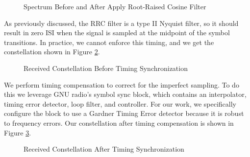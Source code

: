 \documentclass[conference,onecolumn]{IEEEtran}
\begin{document}
\begin{figure}[H]
	\centerline{}
	\caption{Spectrum Before and After Apply Root-Raised Cosine Filter}
	\label{fig::root_raised_cosine_spectrum}
\end{figure}

\noindent As previously discussed, the RRC filter is a type II Nyquist filter, so it should result in zero ISI when the signal is sampled at the midpoint of the symbol transitions. In practice, we cannot enforce this timing, and we get the constellation shown in Figure \ref{fig::constellation_no_timing_comp}.

\begin{figure}[H]
	\centerline{}
	\caption{Received Constellation Before Timing Synchronization}
	\label{fig::constellation_no_timing_comp}
\end{figure}

\noindent We perform timing compensation to correct for the imperfect sampling. To do this we leverage GNU radio's symbol sync block, which contains an interpolator, timing error detector, loop filter, and controller. For our work, we specifically configure the block to use a Gardner Timing Error detector because it is robust to frequency errors. Our constellation after timing compensation is shown in Figure \ref{fig::constellation_after_timing_comp}.

\begin{figure}[H]
	\centerline{}
	\caption{Received Constellation After Timing Synchronization}
	\label{fig::constellation_after_timing_comp}
\end{figure}
\end{document}
